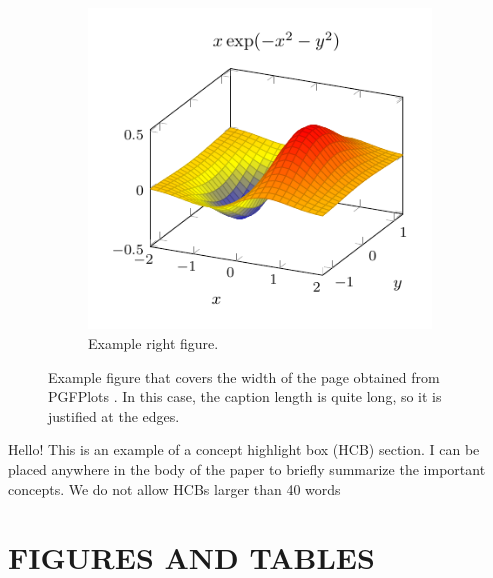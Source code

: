 \documentclass[9pt,article,twoside]{rmaa-rho-class/rmaa-rho}
\begin{document}
\begin{figure}[ht]
\begin{subfigure}[b]{0.38\linewidth}
            \includegraphics[width=\linewidth]{figures/surface-plot-math.pdf}
            \caption{Example right figure.}
            \label{fig:figb}
        \end{subfigure}
        \caption{\justifying Example figure that covers the width of the page obtained from PGFPlots \cite{PFGPlots}. In this case, the caption length is quite long, so it is justified at the edges.}
        \label{fig:examplefloat}
    \end{figure}


    
    \begin{rhoenv}[frametitle=Highlight Concept Box]
        Hello! This is an example of a concept highlight box (HCB) section. I can be placed anywhere in the body of the paper to briefly summarize the important concepts. We do not allow HCBs larger than 40 words \label{box:box1}
    \end{rhoenv}

\section{FIGURES AND TABLES}
\end{document}
